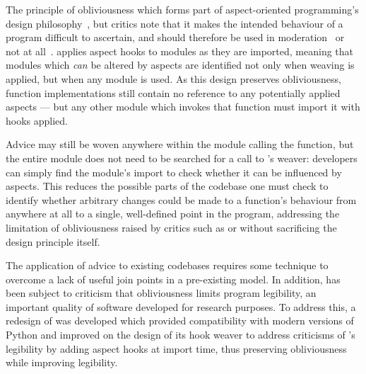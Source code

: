 \begin{description}[style=unboxed]

  \item[A new aspect weaving technique aiming to improve aspect-oriented code's legibility]
    The principle of obliviousness which forms part of aspect-oriented
    programming's design
    philosophy~\cite{filman2000aspect,kell2008survey,Charfi2006AspectOrientedWL},
    but critics note that it makes the intended behaviour of a program difficult
    to ascertain, and should therefore be used in
    moderation~\cite{leavens2007multiple} or not at
    all~\cite{przybylek2010wrong,Constantinides04aopconsidered}. \pdsfthree{} applies
    aspect hooks to modules as they are imported, meaning that modules which
    \emph{can} be altered by aspects are identified not only when weaving is
    applied, but when any module is used. As this design preserves
    obliviousness, function implementations still contain no reference to any
    potentially applied aspects --- but any other module which invokes that function
    must import it with hooks applied.

    Advice may still be woven anywhere within the module calling the function,
    but the entire module does not need to be searched for a call to \pdsfthree{}'s
    weaver: developers can simply find the module's import to check whether it
    can be influenced by aspects. This reduces the possible parts of the
    codebase one must check to identify whether arbitrary changes could be made
    to a function's behaviour from anywhere at all to a single, well-defined
    point in the program, addressing the limitation of obliviousness raised by
    critics such as \citet{leavens2007multiple} or
    \citet{Constantinides04aopconsidered} without sacrificing the design
    principle itself.


  \item[Development of a tool which is suitable for use in aspect-oriented
    modelling \& simulation] The application of advice to existing codebases
    requires some technique to overcome a lack of useful join points in a
    pre-existing model. In addition, \aop{} has been subject to criticism that
    obliviousness limits program legibility, an important quality of software
    developed for research purposes. To address this, a redesign of \pdsf{} was
    developed which provided compatibility with modern versions of Python and
    improved on the design of its hook weaver to address criticisms of \aop{}'s
    legibility by adding aspect hooks at import time, thus preserving
    obliviousness while improving legibility.


\end{description}
